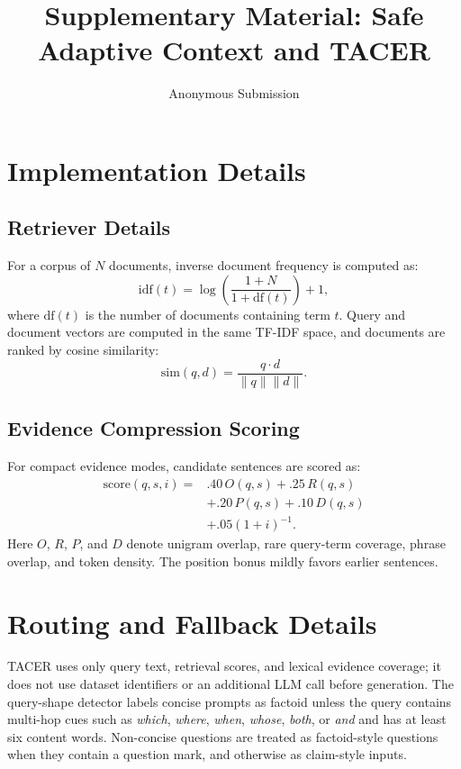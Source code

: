 \documentclass[11pt]{article}
\title{Supplementary Material: Safe Adaptive Context and TACER}
\author{Anonymous Submission}
\begin{document}
\maketitle
\raggedbottom

\appendix

\section{Implementation Details}

\subsection{Retriever Details}

For a corpus of $N$ documents, inverse document frequency is computed as:
\[
\mathrm{idf}(t)=\log\left(\frac{1+N}{1+\mathrm{df}(t)}\right)+1,
\]
where $\mathrm{df}(t)$ is the number of documents containing term $t$. Query and document vectors are computed in the same TF-IDF space, and documents are ranked by cosine similarity:
\[
\mathrm{sim}(q,d)=\frac{q\cdot d}{\lVert q\rVert \lVert d\rVert}.
\]

\subsection{Evidence Compression Scoring}

For compact evidence modes, candidate sentences are scored as:
\[
\begin{aligned}
\mathrm{score}(q,s,i) ={}& .40\,O(q,s)+.25\,R(q,s)\\
&+.20\,P(q,s)+.10\,D(q,s)\\
&+.05(1+i)^{-1}.
\end{aligned}
\]
Here $O$, $R$, $P$, and $D$ denote unigram overlap, rare query-term coverage, phrase overlap, and token density. The position bonus mildly favors earlier sentences.

\section{Routing and Fallback Details}

TACER uses only query text, retrieval scores, and lexical evidence coverage; it does not use dataset identifiers or an additional LLM call before generation. The query-shape detector labels concise prompts as factoid unless the query contains multi-hop cues such as \emph{which}, \emph{where}, \emph{when}, \emph{whose}, \emph{both}, or \emph{and} and has at least six content words. Non-concise questions are treated as factoid-style questions when they contain a question mark, and otherwise as claim-style inputs.
\end{document}
